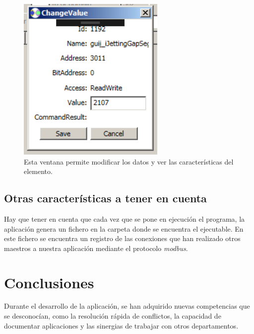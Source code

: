 \documentclass[pdftex,11pt,a4paper]{book}
\begin{document}
\begin{figure}
\begin{center}
\includegraphics[]{img/disenyo_emergente.png}
\caption{\label{datos}Esta ventana permite modificar los datos y ver las características del elemento.}
\end{center}
\end{figure}

\section{Otras características a tener en cuenta}

Hay que tener en cuenta que cada vez que se pone en ejecución el programa, la aplicación genera un fichero en la carpeta donde se encuentra el ejecutable. En este fichero se encuentra un registro de las conexiones que han realizado otros maestros a nuestra aplicación mediante el protocolo \emph{modbus}.



\chapter{Conclusiones}

Durante el desarrollo de la aplicación, se han adquirido nuevas competencias que se desconocían, como la resolución rápida de conflictos, la capacidad de documentar aplicaciones y las sinergias de trabajar con otros departamentos.
\end{document}
